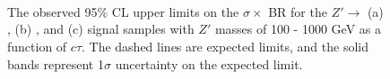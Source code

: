 \begin{figure}[!htb]
    \centering
     \\
        \\
       \\
    \caption{The observed 95$\%$ CL upper limits on the $\sigma \times$ BR for the $Z'\rightarrow$ (a) \mumu, (b) \ee, and (c) \emu signal samples with $Z'$ masses of 100 - 1000 GeV as a function of $c\tau$. The dashed lines are expected limits, and the solid bands represent 1$\sigma$ uncertainty on the expected limit.}
    \label{fig:upper_limits}
\end{figure}

